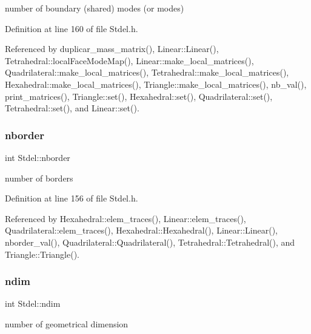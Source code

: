 number of boundary (shared) modes (or modes) 



Definition at line 160 of file Stdel.\+h.



Referenced by duplicar\+\_\+mass\+\_\+matrix(), Linear\+::\+Linear(), Tetrahedral\+::local\+Face\+Mode\+Map(), Linear\+::make\+\_\+local\+\_\+matrices(), Quadrilateral\+::make\+\_\+local\+\_\+matrices(), Tetrahedral\+::make\+\_\+local\+\_\+matrices(), Hexahedral\+::make\+\_\+local\+\_\+matrices(), Triangle\+::make\+\_\+local\+\_\+matrices(), nb\+\_\+val(), print\+\_\+matrices(), Triangle\+::set(), Hexahedral\+::set(), Quadrilateral\+::set(), Tetrahedral\+::set(), and Linear\+::set().

\mbox{\label{classStdel_ad0f111a2ba3d9415618c8408da3fc100}} 
\subsubsection{\texorpdfstring{nborder}{nborder}}
{\footnotesize\ttfamily int Stdel\+::nborder\hspace{0.3cm}{\ttfamily [protected]}}



number of borders 



Definition at line 156 of file Stdel.\+h.



Referenced by Hexahedral\+::elem\+\_\+traces(), Linear\+::elem\+\_\+traces(), Quadrilateral\+::elem\+\_\+traces(), Hexahedral\+::\+Hexahedral(), Linear\+::\+Linear(), nborder\+\_\+val(), Quadrilateral\+::\+Quadrilateral(), Tetrahedral\+::\+Tetrahedral(), and Triangle\+::\+Triangle().

\mbox{\label{classStdel_a912f36b591d847eed2531a3b3a51a520}} 
\subsubsection{\texorpdfstring{ndim}{ndim}}
{\footnotesize\ttfamily int Stdel\+::ndim\hspace{0.3cm}{\ttfamily [protected]}}



number of geometrical dimension 



